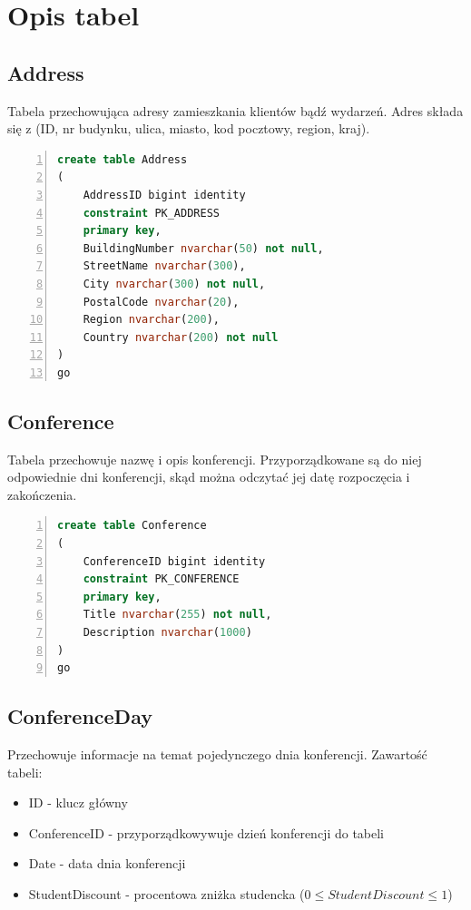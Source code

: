 \documentclass[]{article}
\begin{document}
\section{Opis tabel}
	\subsection{Address}
	Tabela przechowująca adresy zamieszkania klientów bądź wydarzeń. Adres składa się z (ID, nr budynku, ulica, miasto, kod pocztowy, region, kraj).
	\begin{lstlisting}[language=SQL,
						showspaces=false,
						basicstyle=\ttfamily,
						numbers=left,
						numberstyle=\tiny,
						backgroundcolor=\color{lightg},
						keywordstyle=\color{lightblue},
						commentstyle=\color{gray}]
create table Address
(
	AddressID bigint identity
	constraint PK_ADDRESS
	primary key,
	BuildingNumber nvarchar(50) not null,
	StreetName nvarchar(300),
	City nvarchar(300) not null,
	PostalCode nvarchar(20),
	Region nvarchar(200),
	Country nvarchar(200) not null
)
go

		\end{lstlisting}
	\subsection{Conference}
	Tabela przechowuje nazwę i opis konferencji. Przyporządkowane są do niej odpowiednie dni konferencji, skąd można odczytać jej datę rozpoczęcia i zakończenia.
	\begin{lstlisting}[language=SQL,
						showspaces=false,
						basicstyle=\ttfamily,
						numbers=left,
						numberstyle=\tiny,
						backgroundcolor=\color{lightg},
						keywordstyle=\color{lightblue},
						commentstyle=\color{gray}]
create table Conference
(
	ConferenceID bigint identity
	constraint PK_CONFERENCE
	primary key,
	Title nvarchar(255) not null,
	Description nvarchar(1000)
)
go
	\end{lstlisting}
	
	\subsection{ConferenceDay}
	Przechowuje informacje na temat pojedynczego dnia konferencji. Zawartość tabeli:
	\begin{itemize}
		\item ID - klucz główny
		\item ConferenceID - przyporządkowywuje dzień konferencji do tabeli
		\item Date - data dnia konferencji
		\item StudentDiscount - procentowa zniżka studencka ($0\leq StudentDiscount\leq 1$)
	\end{itemize}
	
\end{document}
